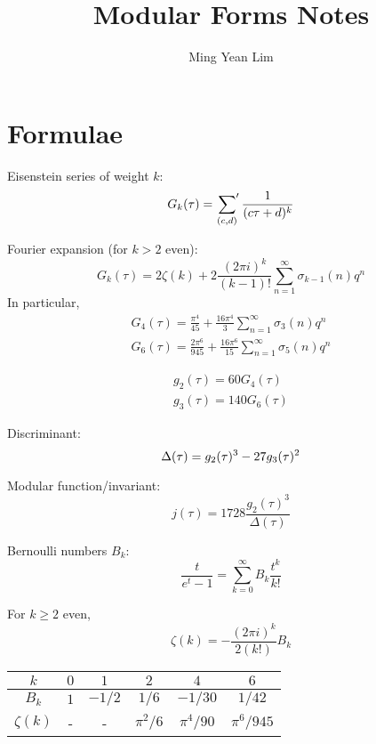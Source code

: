 \documentclass[11pt]{article}
\title{Modular Forms Notes}
\author{Ming Yean Lim}
\date{}
\begin{document}
\maketitle

\section*{Formulae}

Eisenstein series of weight $k$:
\begin{equation*}
    G_k(\tau) = \sideset{}{'}\sum_{(c, d)} \frac{1}{(c \tau + d)^k}
\end{equation*}

\noindent Fourier expansion (for $k > 2$ even):
\begin{equation*}
    G_k(\tau) = 2 \zeta(k) + 2 \frac{(2 \pi i)^k}{(k-1)!} \sum_{n=1}^\infty \sigma_{k-1}(n) q^n
\end{equation*}
In particular,
\begin{gather*}
    G_4(\tau) = \frac{\pi^4}{45} + \frac{16 \pi^4}{3} \sum_{n=1}^\infty \sigma_3(n) q^n\\
    G_6(\tau) = \frac{2\pi^6}{945} + \frac{16 \pi^6}{15} \sum_{n=1}^\infty \sigma_5(n) q^n
\end{gather*}

\begin{gather*}
    g_2(\tau) = 60 G_4(\tau)\\
    g_3(\tau) = 140 G_6(\tau)
\end{gather*}

\noindent Discriminant:
\begin{equation*}
    \Delta(\tau) = g_2(\tau)^3 - 27g_3(\tau)^2\\
\end{equation*}

\noindent Modular function/invariant:
\begin{equation*}
    j(\tau) = 1728 \frac{g_2(\tau)^3}{\Delta(\tau)}
\end{equation*}

\noindent Bernoulli numbers $B_k$:
\begin{equation*}
    \frac{t}{e^t - 1} = \sum_{k=0}^{\infty} B_k \frac{t^k}{k!}
\end{equation*}

\noindent For $k \ge 2$ even,
\begin{equation*}
    \zeta(k) = -\frac{(2\pi i)^k}{2 (k!)} B_k
\end{equation*}

\begin{center}
\begin{tabular}{|c|c|c|c|c|c|}
    \hline
    $k$ & $0$ & $1$ & $2$ & $4$ & $6$\\
    \hline
    $B_k$ & $1$ & $-1/2$ & $1/6$ & $-1/30$ & $1/42$\\
    $\zeta(k)$ & - & - & $\pi^2 / 6$ & $\pi^4 / 90$ & $\pi^6 / 945$ \\
    \hline
\end{tabular}
\end{center}
\end{document}
